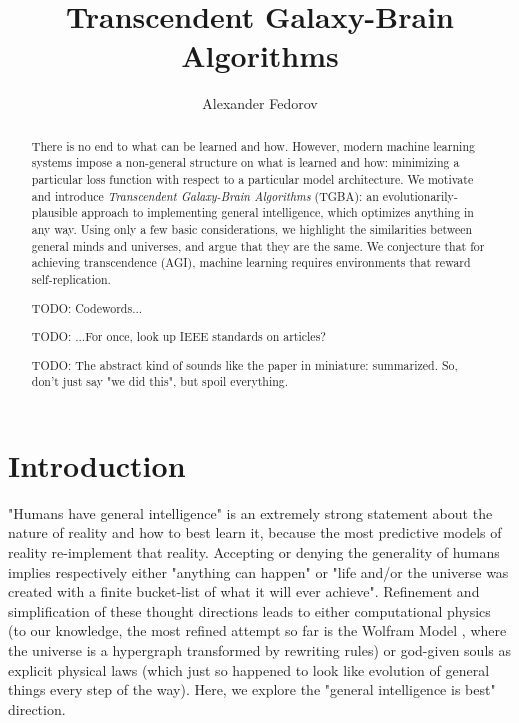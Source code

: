 \documentclass{article}
\begin{document}
\title{Transcendent Galaxy-Brain Algorithms}
\author{Alexander Fedorov}

\maketitle

\begin{abstract}

There is no end to what can be learned and how. However, modern machine learning systems impose a non-general structure on what is learned and how: minimizing a particular loss function with respect to a particular model architecture. We motivate and introduce \textit{Transcendent Galaxy-Brain Algorithms} (TGBA): an evolutionarily-plausible approach to implementing general intelligence, which optimizes anything in any way. Using only a few basic considerations, we highlight the similarities between general minds and universes, and argue that they are the same. We conjecture that for achieving transcendence (AGI), machine learning requires environments that reward self-replication.

    TODO: Codewords...

    TODO: ...For once, look up IEEE standards on articles?

    TODO: The abstract kind of sounds like the paper in miniature: summarized. So, don't just say "we did this", but spoil everything.

\end{abstract}

\section{Introduction}

"Humans have general intelligence" is an extremely strong statement about the nature of reality and how to best learn it, because the most predictive models of reality re-implement that reality. Accepting or denying the generality of humans implies respectively either "anything can happen" or "life and/or the universe was created with a finite bucket-list of what it will ever achieve". Refinement and simplification of these thought directions leads to either computational physics (to our knowledge, the most refined attempt so far is the Wolfram Model \cite{Wolfram_2020}, where the universe is a hypergraph transformed by rewriting rules) or god-given souls as explicit physical laws (which just so happened to look like evolution of general things every step of the way). Here, we explore the "general intelligence is best" direction.
\end{document}
